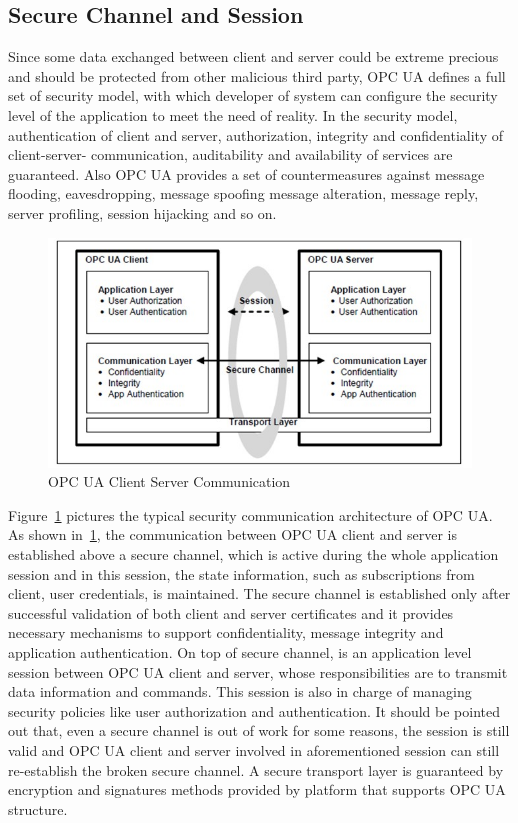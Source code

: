 \documentclass[]{llncs}
\begin{document}
\subsection{Secure Channel and Session}
Since some data exchanged between client and server could be extreme precious and should be protected from other malicious third party, OPC UA defines a full set of security model, with which developer of system can configure the security level of the application to meet the need of reality. In the security model, authentication of client and server, authorization, integrity and confidentiality of client-server- communication, auditability and availability of services are guaranteed. Also OPC UA provides a set of countermeasures against message flooding, eavesdropping, message spoofing message alteration, message reply, server profiling, session hijacking and so on\cite{O2}.
\begin{figure}
	\centering
	\includegraphics[width=1.1\textwidth]{opc_ua_cs_comm.jpg}
		\caption[ ]{OPC UA Client Server Communication\cite{O2}}
	\label{fig:opc_ua_cs_comm}
\end{figure}


Figure~\ref{fig:opc_ua_cs_comm} pictures the typical security communication architecture of OPC UA. As shown in~\ref{fig:opc_ua_cs_comm}, the communication between OPC UA client and server is established above a secure channel, which is active during the whole application session and in this session, the state information, such as subscriptions from client, user credentials, is maintained. The secure channel is established only after successful validation of both client and server certificates and it provides necessary mechanisms to support confidentiality, message integrity and application authentication. On top of secure channel, is an application level session between OPC UA client and server, whose responsibilities are to transmit data information and commands. This session is also in charge of managing security policies like user authorization and authentication. It should be pointed out that, even a secure channel is out of work for some reasons, the session is still valid and OPC UA client and server involved in aforementioned session can still re-establish the broken secure channel. A secure transport layer is guaranteed by encryption and signatures methods provided by platform that supports OPC UA structure.
\end{document}
